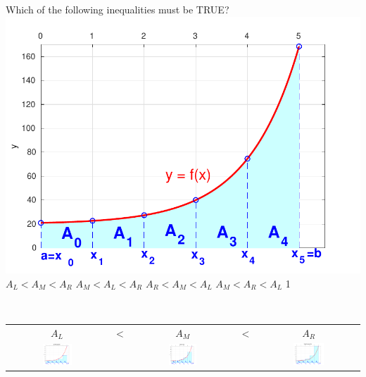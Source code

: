 \documentclass[10pt]{article}
\newcounter{totalQ}\setcounter{totalQ}{1}
\newcommand{\mysecnum}{0}
\newenvironment{clicklist}{%
  \begin{enumerate}
    \renewcommand{\labelenumi}{{\sffamily\bfseries Q{\mysecnum}--\arabic{enumi}.}}
    \renewcommand{\labelenumi}{{\sffamily\bfseries Q{\mysecnum}--\arabic{enumi}${}^\text{\arabic{totalQ}}$.}}
    \setlength{\itemindent}{\widthof{Q}+\labelsep}
  }{%
  \end{enumerate}}
\begin{document}
\begin{clicklist}
{{      Which of the following inequalities must be TRUE?}%
    {\includegraphics[width=\textwidth]{figures/trap2}}}%
  {$A_L < A_M < A_R$}%
  {$A_M < A_L < A_R$}%
  {$A_R < A_M < A_L$}%
  {$A_M < A_R < A_L$}%
  {1}{\mbox{}\\
    \begin{center}
      \begin{tabular}{c@{}c@{}c@{}c@{}c}
        $A_L$ & $<$ & $A_M$ & $<$ & $A_R$\\
        \includegraphics[width=0.31\textwidth]{figures/trap2_1}&&
        \includegraphics[width=0.3\textwidth]{figures/trap2_3}&&
        \includegraphics[width=0.32\textwidth]{figures/trap2_2}
      \end{tabular}
    \end{center}}{\mah}


\end{clicklist}
\end{document}
